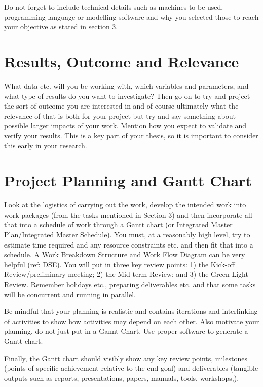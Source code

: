 \documentclass[12pt, english, NoHyper]{AE4010-template}
\begin{document}
Do not forget to include technical details such as machines to be used, programming language or modelling software and why you selected those to reach your objective as stated in section 3.




\section{Results, Outcome and Relevance}
What data etc. will you be working with, which variables and parameters, and what type of results do you want to investigate? Then go on to try and project the sort of outcome you are interested in and of course ultimately what the relevance of that is both for your project but try and say something about possible larger impacts of your work. Mention how you expect to validate and verify your results. This is a key part of your thesis, so it is important to consider this early in your research.





\section{Project Planning and Gantt Chart}
Look at the logistics of carrying out the work, develop the intended work into work packages (from the tasks mentioned in Section 3) and then incorporate all that into a schedule of work through a Gantt chart (or Integrated Master Plan/Integrated Master Schedule). You must, at a reasonably high level, try to estimate time required and any resource constraints etc. and then fit that into a schedule. A Work Breakdown Structure and Work Flow Diagram can be very helpful (ref: DSE). You will put in three key review points: 1) the Kick-off Review/preliminary meeting; 2) the Mid-term Review; and 3) the Green Light Review. Remember holidays etc., preparing deliverables etc. and that some tasks will be concurrent and running in parallel. 

Be mindful that your planning is realistic and contains iterations and interlinking of activities to show how activities may depend on each other. Also motivate your planning, do not just put in a Gannt Chart. Use proper software to generate a Gantt chart.

\noindent Finally, the Gantt chart should visibly show any key review points, milestones (points of specific achievement relative to the end goal) and deliverables (tangible outputs such as reports, presentations, papers, manuals, tools, workshops,).
\end{document}
